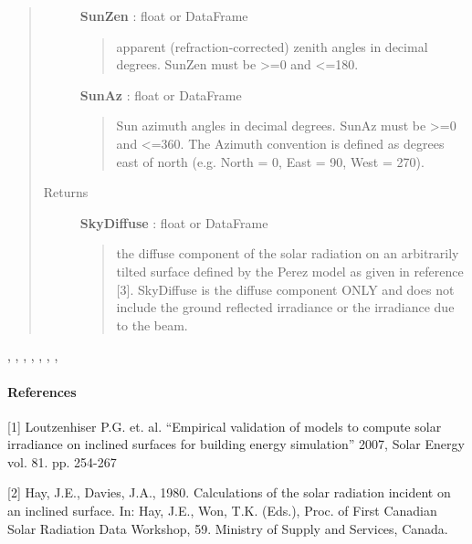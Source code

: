 \documentclass[letterpaper,10pt,english]{sphinxmanual}
\begin{document}
\begin{fulllineitems}
\begin{quote}
\begin{description}
\begin{quote}
\begin{description}
\end{description}
\end{quote}

\textbf{SunZen} : float or DataFrame
\begin{quote}

apparent (refraction-corrected) zenith
angles in decimal degrees. 
SunZen must be \textgreater{}=0 and \textless{}=180.
\end{quote}

\textbf{SunAz} : float or DataFrame
\begin{quote}

Sun azimuth angles in decimal degrees.
SunAz must be \textgreater{}=0 and \textless{}=360. The Azimuth convention is defined
as degrees east of north (e.g. North = 0, East = 90, West = 270).
\end{quote}

\item[{Returns}] \leavevmode
\textbf{SkyDiffuse} : float or DataFrame
\begin{quote}

the diffuse component of the solar radiation  on an
arbitrarily tilted surface defined by the Perez model as given in
reference {[}3{]}.
SkyDiffuse is the diffuse component ONLY and does not include the ground
reflected irradiance or the irradiance due to the beam.
\end{quote}

\end{description}\end{quote}




{\hyperref[stubs/pvlib.pvl_ephemeris:pvlib.pvl_ephemeris]{}}, {\hyperref[stubs/pvlib.pvl_extraradiation:pvlib.pvl_extraradiation]{}}, {\hyperref[stubs/pvlib.pvl_isotropicsky:pvlib.pvl_isotropicsky]{}}, {\hyperref[stubs/pvlib.pvl_reindl1990:pvlib.pvl_reindl1990]{}}, {\hyperref[stubs/pvlib.pvl_perez:pvlib.pvl_perez]{}}, {\hyperref[stubs/pvlib.pvl_klucher1979:pvlib.pvl_klucher1979]{}}, {\hyperref[stubs/pvlib.pvl_kingdiffuse:pvlib.pvl_kingdiffuse]{}}, {\hyperref[stubs/pvlib.pvl_spa:pvlib.pvl_spa]{}}


\paragraph{References}

{[}1{]} Loutzenhiser P.G. et. al. ``Empirical validation of models to compute
solar irradiance on inclined surfaces for building energy simulation''
2007, Solar Energy vol. 81. pp. 254-267

{[}2{]} Hay, J.E., Davies, J.A., 1980. Calculations of the solar radiation incident
on an inclined surface. In: Hay, J.E., Won, T.K. (Eds.), Proc. of First
Canadian Solar Radiation Data Workshop, 59. Ministry of Supply
and Services, Canada.

\end{fulllineitems}
\end{document}
